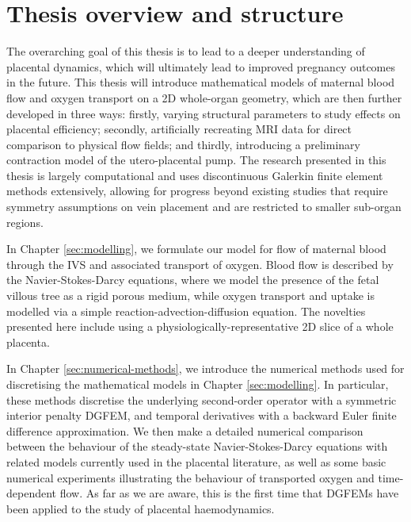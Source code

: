     \section{Thesis overview and structure}

        The overarching goal of this thesis is to lead to a deeper understanding of placental dynamics, which will ultimately lead to improved pregnancy outcomes in the future. This thesis will introduce mathematical models of maternal blood flow and oxygen transport on a 2D whole-organ geometry, which are then further developed in three ways: firstly, varying structural parameters to study effects on placental efficiency; secondly, artificially recreating MRI data for direct comparison to physical flow fields; and thirdly, introducing a preliminary contraction model of the utero-placental pump. The research presented in this thesis is largely computational and uses discontinuous Galerkin finite element methods extensively, allowing for progress beyond existing studies that require symmetry assumptions on vein placement and are restricted to smaller sub-organ regions.

        In Chapter \ref{sec:modelling}, we formulate our model for flow of maternal blood through the IVS and associated transport of oxygen. Blood flow is described by the Navier-Stokes-Darcy equations, where we model the presence of the fetal villous tree as a rigid porous medium, while oxygen transport and uptake is modelled via a simple reaction-advection-diffusion equation. The novelties presented here include using a physiologically-representative 2D slice of a whole placenta.

        In Chapter \ref{sec:numerical-methods}, we introduce the numerical methods used for discretising the mathematical models in Chapter \ref{sec:modelling}. In particular, these methods discretise the underlying second-order operator with a symmetric interior penalty DGFEM, and temporal derivatives with a backward Euler finite difference approximation. We then make a detailed numerical comparison between the behaviour of the steady-state Navier-Stokes-Darcy equations with related models currently used in the placental literature, as well as some basic numerical experiments illustrating the behaviour of transported oxygen and time-dependent flow. As far as we are aware, this is the first time that DGFEMs have been applied to the study of placental haemodynamics.

